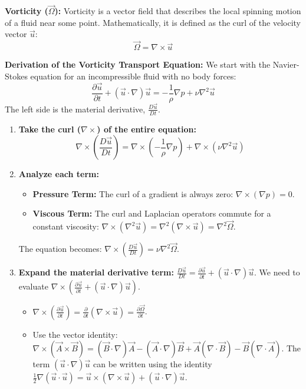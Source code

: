 \documentclass{article}
\begin{document}
\textbf{Vorticity ($\vec{\Omega}$):}
Vorticity is a vector field that describes the local spinning motion of a fluid near some point. Mathematically, it is defined as the curl of the velocity vector $\vec{u}$:
$$ \vec{\Omega} = \nabla \times \vec{u} $$

\textbf{Derivation of the Vorticity Transport Equation:}
We start with the Navier-Stokes equation for an incompressible fluid with no body forces:
$$ \frac{\partial \vec{u}}{\partial t} + (\vec{u} \cdot \nabla)\vec{u} = -\frac{1}{\rho}\nabla p + \nu \nabla^2 \vec{u} $$
The left side is the material derivative, $\frac{D\vec{u}}{Dt}$.
\begin{enumerate}
    \item \textbf{Take the curl ($\nabla \times$) of the entire equation:}
    $$ \nabla \times \left(\frac{D\vec{u}}{Dt}\right) = \nabla \times \left(-\frac{1}{\rho}\nabla p\right) + \nabla \times (\nu \nabla^2 \vec{u}) $$
    \item \textbf{Analyze each term:}
    \begin{itemize}
        \item \textbf{Pressure Term:} The curl of a gradient is always zero: $\nabla \times (\nabla p) = 0$.
        \item \textbf{Viscous Term:} The curl and Laplacian operators commute for a constant viscosity: $\nabla \times (\nabla^2 \vec{u}) = \nabla^2 (\nabla \times \vec{u}) = \nabla^2 \vec{\Omega}$.
    \end{itemize}
    The equation becomes: $\nabla \times \left(\frac{D\vec{u}}{Dt}\right) = \nu \nabla^2 \vec{\Omega}$.
    \item \textbf{Expand the material derivative term:}
    $\frac{D\vec{u}}{Dt} = \frac{\partial \vec{u}}{\partial t} + (\vec{u} \cdot \nabla)\vec{u}$.
    We need to evaluate $\nabla \times \left( \frac{\partial \vec{u}}{\partial t} + (\vec{u} \cdot \nabla)\vec{u} \right)$.
    \begin{itemize}
        \item $\nabla \times (\frac{\partial \vec{u}}{\partial t}) = \frac{\partial}{\partial t}(\nabla \times \vec{u}) = \frac{\partial \vec{\Omega}}{\partial t}$.
        \item Use the vector identity: $\nabla \times (\vec{A} \times \vec{B}) = (\vec{B}\cdot\nabla)\vec{A} - (\vec{A}\cdot\nabla)\vec{B} + \vec{A}(\nabla\cdot\vec{B}) - \vec{B}(\nabla\cdot\vec{A})$. The term $(\vec{u} \cdot \nabla)\vec{u}$ can be written using the identity $\frac{1}{2}\nabla(\vec{u}\cdot\vec{u}) = \vec{u} \times (\nabla \times \vec{u}) + (\vec{u}\cdot\nabla)\vec{u}$.

\end{itemize}
\end{enumerate}
\end{document}
